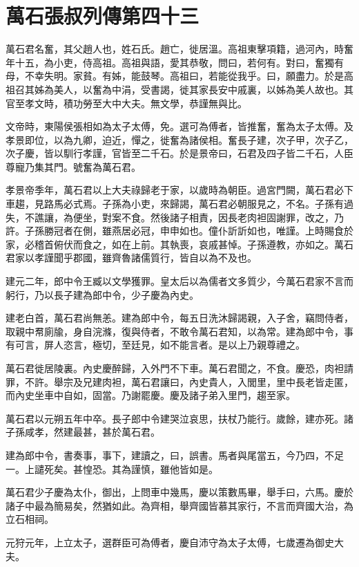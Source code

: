 \chapter{萬石張叔列傳第四十三}

萬石君名奮，其父趙人也，姓石氏。趙亡，徙居溫。高祖東擊項籍，過河內，時奮年十五，為小吏，侍高祖。高祖與語，愛其恭敬，問曰，若何有。對曰，奮獨有母，不幸失明。家貧。有姊，能鼓琴。高祖曰，若能從我乎。曰，願盡力。於是高祖召其姊為美人，以奮為中涓，受書謁，徙其家長安中戚裏，以姊為美人故也。其官至孝文時，積功勞至大中大夫。無文學，恭謹無與比。

文帝時，東陽侯張相如為太子太傅，免。選可為傅者，皆推奮，奮為太子太傅。及孝景即位，以為九卿，迫近，憚之，徙奮為諸侯相。奮長子建，次子甲，次子乙，次子慶，皆以馴行孝謹，官皆至二千石。於是景帝曰，石君及四子皆二千石，人臣尊寵乃集其門。號奮為萬石君。

孝景帝季年，萬石君以上大夫祿歸老于家，以歲時為朝臣。過宮門闕，萬石君必下車趨，見路馬必式焉。子孫為小吏，來歸謁，萬石君必朝服見之，不名。子孫有過失，不譙讓，為便坐，對案不食。然後諸子相責，因長老肉袒固謝罪，改之，乃許。子孫勝冠者在側，雖燕居必冠，申申如也。僮仆訢訢如也，唯謹。上時賜食於家，必稽首俯伏而食之，如在上前。其執喪，哀戚甚悼。子孫遵教，亦如之。萬石君家以孝謹聞乎郡國，雖齊魯諸儒質行，皆自以為不及也。

建元二年，郎中令王臧以文學獲罪。皇太后以為儒者文多質少，今萬石君家不言而躬行，乃以長子建為郎中令，少子慶為內史。

建老白首，萬石君尚無恙。建為郎中令，每五日洗沐歸謁親，入子舍，竊問侍者，取親中帬廁牏，身自浣滌，復與侍者，不敢令萬石君知，以為常。建為郎中令，事有可言，屏人恣言，極切，至廷見，如不能言者。是以上乃親尊禮之。

萬石君徙居陵裏。內史慶醉歸，入外門不下車。萬石君聞之，不食。慶恐，肉袒請罪，不許。舉宗及兄建肉袒，萬石君讓曰，內史貴人，入閭里，里中長老皆走匿，而內史坐車中自如，固當。乃謝罷慶。慶及諸子弟入里門，趨至家。

萬石君以元朔五年中卒。長子郎中令建哭泣哀思，扶杖乃能行。歲餘，建亦死。諸子孫咸孝，然建最甚，甚於萬石君。

建為郎中令，書奏事，事下，建讀之，曰，誤書。馬者與尾當五，今乃四，不足一。上譴死矣。甚惶恐。其為謹慎，雖他皆如是。

萬石君少子慶為太仆，御出，上問車中幾馬，慶以策數馬畢，舉手曰，六馬。慶於諸子中最為簡易矣，然猶如此。為齊相，舉齊國皆慕其家行，不言而齊國大治，為立石相祠。

元狩元年，上立太子，選群臣可為傅者，慶自沛守為太子太傅，七歲遷為御史大夫。

